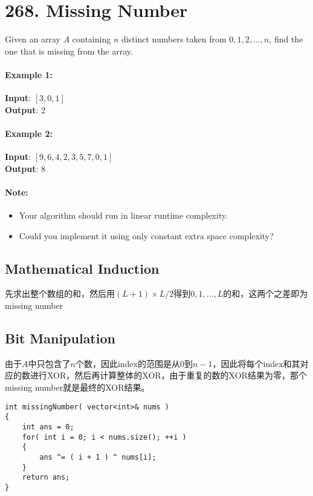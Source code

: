 \section{268. Missing Number}
Given an array $A$ containing $n$ distinct numbers taken from $0, 1, 2, \ldots, n$, find the one that is missing from the array.

\paragraph{Example 1:}

\begin{flushleft}
\textbf{Input}: $[3,0,1]$
\\
\textbf{Output}: 2
\end{flushleft}

\paragraph{Example 2:}

\begin{flushleft}
\textbf{Input}: $[9,6,4,2,3,5,7,0,1]$
\\
\textbf{Output}: 8
\end{flushleft}

\paragraph{Note:}
\begin{itemize}
\item Your algorithm should run in linear runtime complexity. \item Could you implement it using only constant extra space complexity?
\end{itemize}
\subsection{Mathematical Induction}
先求出整个数组的和，然后用$(L+1)\times L/2$得到$0,1,\ldots,L$的和，这两个之差即为missing number
\subsection{Bit Manipulation}
由于$A$中只包含了$n$个数，因此index的范围是从$0$到$n-1$，因此将每个index和其对应的数进行XOR，然后再计算整体的XOR，由于重复的数的XOR结果为零，那个missing number就是最终的XOR结果。
\setcounter{lstlisting}{0}
\begin{lstlisting}[style=customc, caption={Bit Manipulation}]
int missingNumber( vector<int>& nums )
{
    int ans = 0;
    for( int i = 0; i < nums.size(); ++i )
    {
        ans ^= ( i + 1 ) ^ nums[i];
    }
    return ans;
}
\end{lstlisting}